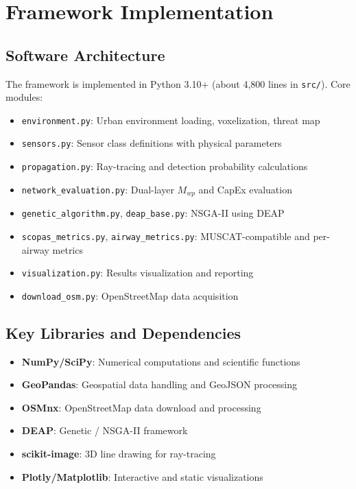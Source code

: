 
\section{Framework Implementation}

\subsection{Software Architecture}

The framework is implemented in Python 3.10+ (about 4,800 lines in \texttt{src/}). Core modules:

\begin{itemize}
\item \texttt{environment.py}: Urban environment loading, voxelization, threat map
\item \texttt{sensors.py}: Sensor class definitions with physical parameters
\item \texttt{propagation.py}: Ray-tracing and detection probability calculations
\item \texttt{network\_evaluation.py}: Dual-layer \(M_{wp}\) and CapEx evaluation
\item \texttt{genetic\_algorithm.py}, \texttt{deap\_base.py}: NSGA-II using DEAP
\item \texttt{scopas\_metrics.py}, \texttt{airway\_metrics.py}: MUSCAT-compatible and per-airway metrics
\item \texttt{visualization.py}: Results visualization and reporting
\item \texttt{download\_osm.py}: OpenStreetMap data acquisition
\end{itemize}

\subsection{Key Libraries and Dependencies}

\begin{itemize}
\item \textbf{NumPy/SciPy}: Numerical computations and scientific functions
\item \textbf{GeoPandas}: Geospatial data handling and GeoJSON processing
\item \textbf{OSMnx}: OpenStreetMap data download and processing
\item \textbf{DEAP}: Genetic / NSGA-II framework \cite{deap2012}
\item \textbf{scikit-image}: 3D line drawing for ray-tracing
\item \textbf{Plotly/Matplotlib}: Interactive and static visualizations
\end{itemize}

